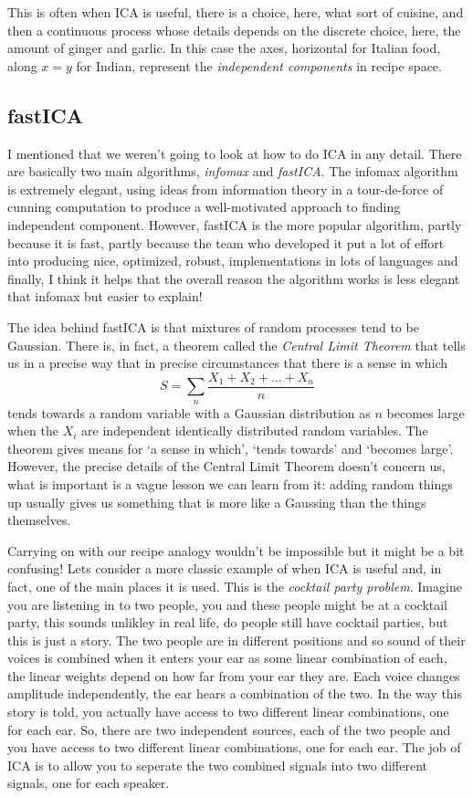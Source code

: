 \documentclass[12pt]{article}
\begin{document}
This is often when ICA is useful, there is a choice, here, what sort
of cuisine, and then a continuous process whose details depends on the
discrete choice, here, the amount of ginger and garlic. In this case
the axes, horizontal for Italian food, along $x=y$ for Indian,
represent the \textsl{independent components} in recipe space.

\subsection*{fastICA}

I mentioned that we weren't going to look at how to do ICA in any
detail. There are basically two main algorithms, \textsl{infomax} and
\textsl{fastICA}. The infomax algorithm is extremely elegant, using
ideas from information theory in a tour-de-force of cunning
computation to produce a well-motivated approach to finding
independent component. However, fastICA is the more popular algorithm,
partly because it is fast, partly because the team who developed it
put a lot of effort into producing nice, optimized, robust,
implementations in lots of languages and finally, I think it helps
that the overall reason the algorithm works is less elegant that
infomax but easier to explain!

The idea behind fastICA is that mixtures of random processes tend to
be Gaussian. There is, in fact, a theorem called the \textsl{Central
  Limit Theorem} that tells us in a precise way that in precise
circumstances that there is a sense in which
\begin{equation}
  S = \sum_n \frac{X_1+X_2+\ldots+X_n}{n}
\end{equation}
tends towards a random variable with a Gaussian distribution as $n$
becomes large when the $X_i$ are independent identically distributed
random variables. The theorem gives means for `a sense in which',
`tends towards' and `becomes large'. However, the precise details of
the Central Limit Theorem doesn't concern us, what is important is a
vague lesson we can learn from it: adding random things up usually
gives us something that is more like a Gaussing than the things
themselves.

Carrying on with our recipe analogy wouldn't be impossible but it
might be a bit confusing! Lets consider a more classic example of when
ICA is useful and, in fact, one of the main places it is used. This is
the \textsl{cocktail party problem}. Imagine you are listening in to
two people, you and these people might be at a cocktail party, this
sounds unlikley in real life, do people still have cocktail parties,
but this is just a story. The two people are in different positions
and so sound of their voices is combined when it enters your ear as
some linear combination of each, the linear weights depend on how far
from your ear they are. Each voice changes amplitude independently,
the ear hears a combination of the two. In the way this story is told,
you actually have access to two different linear combinations, one for
each ear. So, there are two independent sources, each of the two
people and you have access to two different linear combinations, one
for each ear. The job of ICA is to allow you to seperate the two
combined signals into two different signals, one for each speaker.
\end{document}
